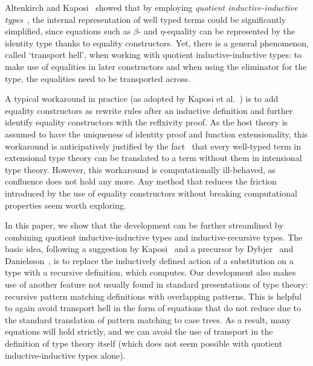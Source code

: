 \documentclass[a4paper,UKenglish,numberwithinsect,cleveref,thm-restate]{lipics-v2021}
\newcommand{\LT}[2][]{\todo[inline,author={L-T},caption={},color={pink},#1]{#2}}
\begin{document}
Altenkirch and Kaposi~\cite{Altenkirch2016a} showed that by employing \emph{quotient inductive-inductive types}~\cite{Altenkirch2018}, the internal representation of well typed terms could be significantly simplified, since equations such as $\beta$- and $\eta$-equality can be represented by the identity type thanks to equality constructors.
%
Yet, there is a general phenomenon, called `transport hell', when working with quotient inductive-inductive types: to make use of equalities in later constructors and when using the eliminator for the type, the equalities need to be transported across.
%

A typical workaround in practice (as adopted by Kaposi et al.~\cite{Kaposi2019}) is to add equality constructors as rewrite rules after an inductive definition and further identify equality constructors with the reflxivity proof.
%
As the host theory is assumed to have the uniqueness of identity proof and function extensionality, this workaround is anticipatively justified by the fact~\cite{Hofmann1996,Winterhalter2019,Kapulkin2025} that every well-typed term in extensional type theory can be translated to a term without them in intensional type theory.
%
However, this workaround is computationally ill-behaved, as confluence does not hold any more.
\LT[noinline]{Do they actually justify this workaround anywhere?}
%
Any method that reduces the friction introduced by the use of equality constructors without breaking computational properties seem worth exploring.
%

In this paper, we show that the development can be further streamlined by combining quotient inductive-inductive types and inductive-recursive types.
%
The basic idea, following a suggestion by Kaposi~\cite{Kaposi2023} and a precursor by Dybjer~\cite{Dybjer1996} and Danielsson~\cite{Danielsson2006}, is to replace the inductively defined action of a substitution on a type with a recursive definition, which computes.
%
Our development also makes use of another feature not usually found in standard presentations of type theory: recursive pattern matching definitions with overlapping patterns.
%
This is helpful to again avoid transport hell in the form of equations that do not reduce due to the standard translation of pattern matching to case trees.
%
As a result, many equations will hold strictly, and we can avoid the use of transport in the definition of type theory itself (which does not seem possible with quotient inductive-inductive types alone).
%
\end{document}
